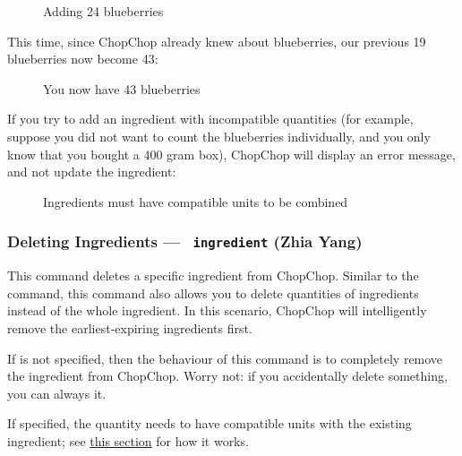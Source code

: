 	\begin{figure}[!htbp]\centering\ContinuedFloat
		\caption{Adding 24 blueberries}
	\end{figure}
	\vspace{-1.5em} %

	This time, since ChopChop already knew about blueberries, our previous 19 blueberries now become 43:

	\begin{figure}[!htbp]\centering\ContinuedFloat
		\caption{You now have 43 blueberries}
	\end{figure}

	If you try to add an ingredient with incompatible quantities (for example, suppose you did not want to count the blueberries
	individually, and you only know that you bought a 400 gram box), ChopChop will display an error message,
	and not update the ingredient:

	\begin{figure}[!htbp]\centering\ContinuedFloat
		\caption{Ingredients must have compatible units to be combined}
	\end{figure}












\hypertarget{DeleteIngredientCommand}{}
\subsubsection{Deleting Ingredients — \texttt{ ingredient} (Zhia Yang)}

	This command deletes a specific ingredient from ChopChop. Similar to the  command, this command also allows
	you to delete quantities of ingredients instead of the whole ingredient. In this scenario, ChopChop will intelligently remove the
	earliest-expiring ingredients first.

	If  is not specified, then the behaviour of this command is to completely remove the ingredient from ChopChop.
	Worry not: if you accidentally delete something, you can always \hyperlink{UndoCommand}{} it.

	\begin{infobox}
		\info{}\hspace{.6em}\parbox{0.9\textwidth}{%
			 If specified, the quantity needs to have compatible units with the existing ingredient;
			see \hyperlink{QuantitiesAndUnits}{this section} for how it works.
		}
	\end{infobox}

